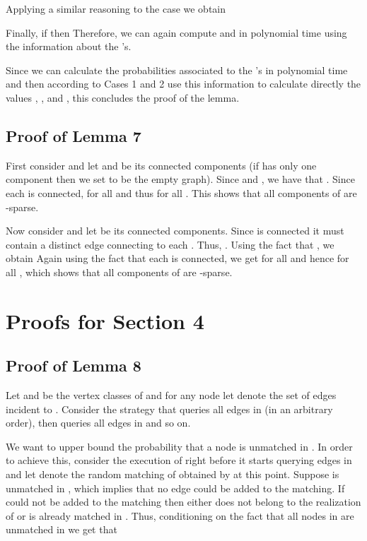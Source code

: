 \documentclass[12pt]{article}
\begin{document}
		
	Applying a similar reasoning to the case  we obtain

	
	Finally, if  then  Therefore, we can again compute  and  in polynomial time using the information about the 's. 
	
	\bigskip Since we can calculate the probabilities associated to the 's in polynomial time and then according to Cases 1 and 2 use this information to calculate directly the values , ,  and , this concludes the proof of the lemma.


	\subsection{Proof of Lemma 7}

		First consider  and let  and  be its connected components (if  has only one component then we set  to be the empty graph). Since  and , we have that . Since each  is connected,  for all  and thus  for all . This shows that all components of  are -sparse. 
		
		Now consider  and let  be its connected components. Since  is connected it must contain a distinct edge connecting  to each . Thus, . Using the fact that , we obtain  Again using the fact that each  is connected, we get  for all  and hence  for all , which shows that all components of  are -sparse.
		

\section{Proofs for Section 4}

	\subsection{Proof of Lemma 8}
	
			Let  and  be the vertex classes of  and for any node  let  denote the set of edges incident to . Consider the strategy  that queries all edges in  (in an arbitrary order), then queries all edges in  and so on. 
			
			We want to upper bound the probability that a node  is unmatched in . In order to achieve this, consider the execution of  right before it starts querying edges in  and let  denote the random matching of  obtained by  at this point. Suppose  is unmatched in , which implies that no edge  could be added to the matching. If  could not be added to the matching then either  does not belong to the realization of  or  is already matched in . Thus, conditioning on the fact that all nodes in  are unmatched in  we get that 
 
\end{document}
